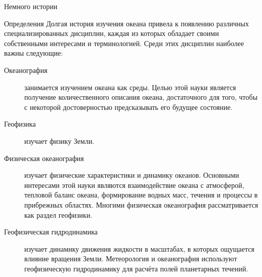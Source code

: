\begin{chapter}{Немного истории}
\begin{section}{Определения}
Долгая история изучения океана привела к появлению различных
специализированных дисциплин, каждая из которых обладает своими
собственными интересами и терминологией. Среди этих дисциплин наиболее важны
следующие:
%

\begin{description}
\item[Океанография] занимается изучением океана как среды. Целью этой
науки является получение количественного описания океана, достаточного
для того, чтобы с некоторой достоверностью предсказывать его будущее
состояние.
%


\item[Геофизика] изучает физику Земли.
%

\item[Физическая океанография] изучает физические характеристики и
динамику океанов. Основными интересами этой науки являются
взаимодействие океана с атмосферой, тепловой баланс океана,
формирование водных масс, течения и процессы в прибрежных
областях. Многими физическая океанография рассматривается как раздел
геофизики.
%

\item[Геофизическая гидродинамика] изучает динамику движения жидкости
в масштабах, в которых ощущается влияние вращения Земли. Метеорология и
океанография используют геофизическую гидродинамику для расчёта полей
планетарных течений.
%


\end{description}
\end{section}
\end{chapter}
